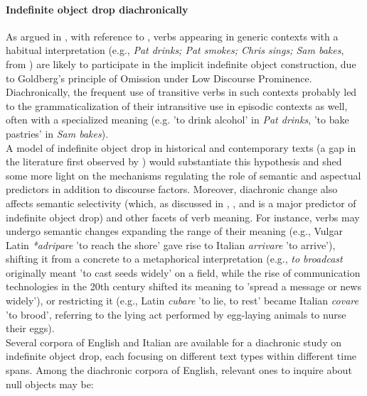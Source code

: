 \paragraph{Indefinite object drop diachronically}
As argued in , with reference to \textcite{Goldberg2001, Goldberg2005a, Lorenzetti2008, Glass2020}, verbs appearing in generic contexts with a habitual interpretation (e.g., \textit{Pat drinks; Pat smokes; Chris sings; Sam bakes}, from \textcite[518]{Goldberg2001}) are likely to participate in the implicit indefinite object construction, due to Goldberg's principle of Omission under Low Discourse Prominence. Diachronically, the frequent use of transitive verbs in such contexts probably led to the grammaticalization of their intransitive use in episodic contexts as well, often with a specialized meaning (e.g. 'to drink alcohol' in \textit{Pat drinks}, 'to bake pastries' in \textit{Sam bakes}).\\
A model of indefinite object drop in historical and contemporary texts (a gap in the literature first observed by \textcite{Goldberg2001}) would substantiate this hypothesis and shed some more light on the mechanisms regulating the role of semantic and aspectual predictors in addition to discourse factors. Moreover, diachronic change also affects semantic selectivity (which, as discussed in , , and  is a major predictor of indefinite object drop) and other facets of verb meaning. For instance, verbs may undergo semantic changes expanding the range of their meaning (e.g., Vulgar Latin \textit{*adripare} 'to reach the shore' gave rise to Italian \textit{arrivare} 'to arrive'), shifting it from a concrete to a metaphorical interpretation (e.g., \textit{to broadcast} originally meant 'to cast seeds widely' on a field, while the rise of communication technologies in the 20th century shifted its meaning to 'spread a message or news widely'), or restricting it (e.g., Latin \textit{cubare} 'to lie, to rest' became Italian \textit{covare} 'to brood', referring to the lying act performed by egg-laying animals to nurse their eggs).\\
Several corpora of English and Italian are available for a diachronic study on indefinite object drop, each focusing on different text types within different time spans. Among the diachronic corpora of English, relevant ones to inquire about null objects may be:
